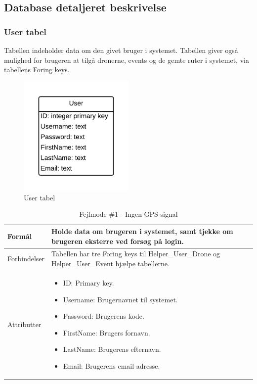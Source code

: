 \newpage
\subsection{Database detaljeret beskrivelse}

\subsubsection{User tabel}
Tabellen indeholder data om den givet bruger i systemet. Tabellen giver også mulighed for brugeren at tilgå dronerne, events og de gemte ruter i systemet, via tabellens Foring keys.
\vspace{-5pt}
\begin{figure}[H]
	\centering
	\includegraphics[width=0.5\textwidth]{Billeder/database/UserTabel.png}
	\vspace{-5pt}
	\caption{User tabel}
	\label{fig:user_tabel}
\end{figure}

\begin{table}[H]
\begin{tabular}{| p{3cm}| p{11.5cm}|}
\hline

Formål	 							& Holde data om brugeren i systemet, samt tjekke om brugeren eksterre ved forsøg på login.\\\hline
Forbindelser						& Tabellen har tre Foring keys til Helper_User_Drone og Helper_User_Event hjælpe tabellerne.\\\hline
Attributter						& \begin{itemize}
												\item ID: Primary key.
												\item Username: Brugernavnet til systemet.
												\item Password: Brugerens kode.
												\item FirstName: Brugers fornavn.
												\item LastName: Brugerens efternavn.
												\item Email: Brugerens email adresse.
											\end{itemize} \\\hline 
\end{tabular}
\caption{Fejlmode \#1 - Ingen GPS signal}
\label{tab:fejlmode1}
\end{table}